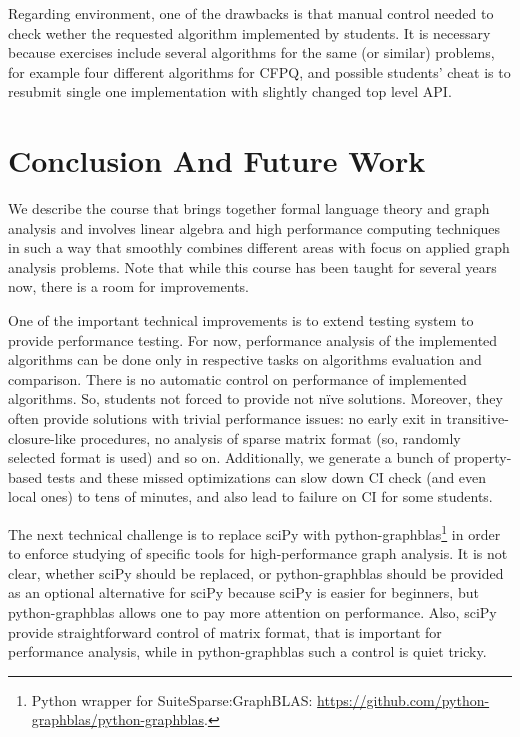 \documentclass[sigconf]{acmart}
\begin{document}
Regarding environment, one of the drawbacks is that manual control needed to check wether the requested algorithm implemented by students.
It is necessary because exercises include several algorithms for the same (or similar) problems, for example four different algorithms for CFPQ, and possible students' cheat is to resubmit single one implementation with slightly changed top level API.


\section{Conclusion And Future Work}

We describe the course that brings together formal language theory and graph analysis and involves linear algebra and high performance computing techniques in such a way that smoothly combines different areas with focus on applied graph analysis problems. 
Note that while this course has been taught for several years now, there is a room for improvements.

One of the important technical improvements is to extend testing system to provide performance testing. 
For now, performance analysis of the implemented algorithms can be done only in respective tasks on algorithms evaluation and comparison.
There is no automatic control on performance of implemented algorithms. 
So, students not forced to provide not n\"ive solutions.
Moreover, they often provide solutions with trivial performance issues: no early exit in transitive-closure-like procedures, no analysis of sparse matrix format (so, randomly selected format is used) and so on.
Additionally, we generate a bunch of property-based tests and these missed optimizations can slow down CI check (and even local ones) to tens of minutes, and also lead to failure on CI for some students.

The next technical challenge is to replace sciPy with python-graphblas\footnote{Python wrapper for SuiteSparse:GraphBLAS: \url{https://github.com/python-graphblas/python-graphblas}.} in order to enforce studying of specific tools for high-performance graph analysis. 
It is not clear, whether sciPy should be replaced, or python-graphblas should be provided as an optional alternative for sciPy because sciPy is easier for beginners, but python-graphblas allows one to pay more attention on performance.
Also, sciPy provide straightforward control of matrix format, that is important for performance analysis, while in python-graphblas such a control is quiet tricky.
\end{document}
